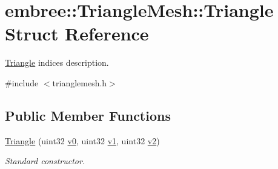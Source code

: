 \hypertarget{structembree_1_1_triangle_mesh_1_1_triangle}{
\section{embree::TriangleMesh::Triangle Struct Reference}
\label{structembree_1_1_triangle_mesh_1_1_triangle}
}


\hyperlink{structembree_1_1_triangle_mesh_1_1_triangle}{Triangle} indices description.  




{\ttfamily \#include $<$trianglemesh.h$>$}

\subsection*{Public Member Functions}
\begin{DoxyCompactItemize}
\item 
\hypertarget{structembree_1_1_triangle_mesh_1_1_triangle_ad69b822283fb7cac7482023030086d9a}{
\hyperlink{structembree_1_1_triangle_mesh_1_1_triangle_ad69b822283fb7cac7482023030086d9a}{Triangle} (uint32 \hyperlink{structembree_1_1_triangle_mesh_1_1_triangle_a6a64226573e6c69a7222711ffc70633b}{v0}, uint32 \hyperlink{structembree_1_1_triangle_mesh_1_1_triangle_ac59363b7ae88edca1535d6b9399303ac}{v1}, uint32 \hyperlink{structembree_1_1_triangle_mesh_1_1_triangle_a4551769e0d69379ed105b52f465cb003}{v2})}
\label{structembree_1_1_triangle_mesh_1_1_triangle_ad69b822283fb7cac7482023030086d9a}

\begin{DoxyCompactList}\small\item\em Standard constructor. \item\end{DoxyCompactList}\end{DoxyCompactItemize}
